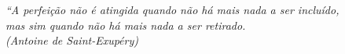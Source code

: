 
\vspace*{\fill}
	\begin{flushright}
		\textit{``A perfeição não é atingida quando não há mais nada a ser incluído,\\
			mas sim quando não há mais nada a ser retirado.\\
			(Antoine de Saint-Exupéry)}
	\end{flushright}
